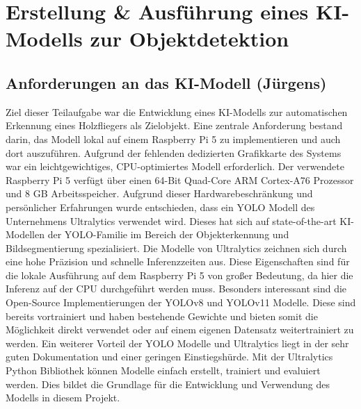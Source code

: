 \chapter{Erstellung \& Ausführung eines KI-Modells zur Objektdetektion}
\section{Anforderungen an das KI-Modell (Jürgens)}
Ziel dieser Teilaufgabe war die Entwicklung eines KI-Modells zur automatischen Erkennung eines Holzfliegers als Zielobjekt. Eine zentrale Anforderung bestand darin, das Modell lokal auf einem Raspberry Pi 5 zu implementieren und auch dort auszuführen. Aufgrund der fehlenden dedizierten Grafikkarte des Systems war ein leichtgewichtiges, CPU-optimiertes Modell erforderlich. Der verwendete Raspberry Pi 5 verfügt über einen 64-Bit Quad-Core ARM Cortex-A76 Prozessor und 8 GB Arbeitsspeicher. \cite{raspberrypi5website} 
Aufgrund dieser Hardwarebeschränkung und persönlicher Erfahrungen wurde entschieden, dass ein YOLO Modell des Unternehmens Ultralytics verwendet wird. Dieses hat sich auf state-of-the-art KI-Modellen der YOLO-Familie im Bereich der Objekterkennung und Bildsegmentierung spezialisiert. \cite{ultralyticsFAQ} Die Modelle von Ultralytics zeichnen sich durch eine hohe Präzision und schnelle Inferenzzeiten aus. Diese Eigenschaften sind für die lokale Ausführung auf dem Raspberry Pi 5 von großer Bedeutung, da hier die Inferenz auf der CPU durchgeführt werden muss. 
Besonders interessant sind die Open-Source Implementierungen der YOLOv8 und YOLOv11 Modelle. Diese sind bereits vortrainiert und haben bestehende Gewichte und bieten somit die Möglichkeit direkt verwendet oder auf einem eigenen Datensatz weitertrainiert zu werden. Ein weiterer Vorteil der YOLO Modelle und Ultralytics liegt in der sehr guten Dokumentation und einer geringen Einstiegshürde. Mit der Ultralytics Python Bibliothek können Modelle einfach erstellt, trainiert und evaluiert werden. Dies bildet die Grundlage für die Entwicklung und Verwendung des Modells in diesem Projekt.



